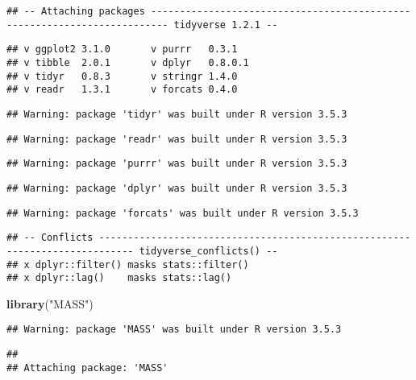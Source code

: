 \documentclass[12pt,]{article}
\newenvironment{Shaded}{\begin{snugshade}}{\end{snugshade}}
\newcommand{\KeywordTok}[1]{\textcolor[rgb]{0.13,0.29,0.53}{\textbf{#1}}}
\newcommand{\StringTok}[1]{\textcolor[rgb]{0.31,0.60,0.02}{#1}}
\newcommand{\NormalTok}[1]{#1}
\begin{document}
\begin{verbatim}
## -- Attaching packages ------------------------------------------------------------------------- tidyverse 1.2.1 --
\end{verbatim}

\begin{verbatim}
## v ggplot2 3.1.0       v purrr   0.3.1  
## v tibble  2.0.1       v dplyr   0.8.0.1
## v tidyr   0.8.3       v stringr 1.4.0  
## v readr   1.3.1       v forcats 0.4.0
\end{verbatim}

\begin{verbatim}
## Warning: package 'tidyr' was built under R version 3.5.3
\end{verbatim}

\begin{verbatim}
## Warning: package 'readr' was built under R version 3.5.3
\end{verbatim}

\begin{verbatim}
## Warning: package 'purrr' was built under R version 3.5.3
\end{verbatim}

\begin{verbatim}
## Warning: package 'dplyr' was built under R version 3.5.3
\end{verbatim}

\begin{verbatim}
## Warning: package 'forcats' was built under R version 3.5.3
\end{verbatim}

\begin{verbatim}
## -- Conflicts ---------------------------------------------------------------------------- tidyverse_conflicts() --
## x dplyr::filter() masks stats::filter()
## x dplyr::lag()    masks stats::lag()
\end{verbatim}

\begin{Shaded}
\begin{Highlighting}[]
\KeywordTok{library}\NormalTok{(}\StringTok{"MASS"}\NormalTok{)}
\end{Highlighting}
\end{Shaded}

\begin{verbatim}
## Warning: package 'MASS' was built under R version 3.5.3
\end{verbatim}

\begin{verbatim}
## 
## Attaching package: 'MASS'
\end{verbatim}
\end{document}
